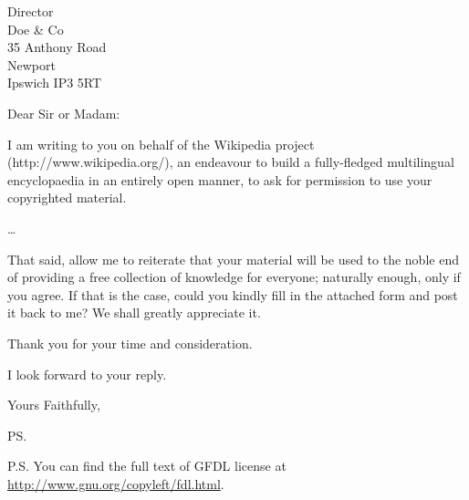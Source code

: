 \documentclass{letter}
\begin{document}
\begin{letter}{Director \\ Doe \& Co \\ 35 Anthony Road
\\ Newport \\ Ipswich IP3 5RT}
\opening{Dear Sir or Madam:}

I am writing to you on behalf of the Wikipedia project (http://www.wikipedia.org/),
an endeavour to build a fully-fledged multilingual encyclopaedia in an entirely
open manner, to ask for permission to use your copyrighted material.

\ldots 

That said, allow me to reiterate that your material will be used to the noble end of
providing a free collection of knowledge for everyone; naturally enough, only if you
agree. If that is the case, could you kindly fill in the attached form and post it
back to me? We shall greatly appreciate it.

Thank you for your time and consideration.

I look forward to your reply.

\closing{Yours Faithfully,}

\ps

P.S. You can find the full text of GFDL license at
\url{http://www.gnu.org/copyleft/fdl.html}.


\end{letter}
\end{document}
